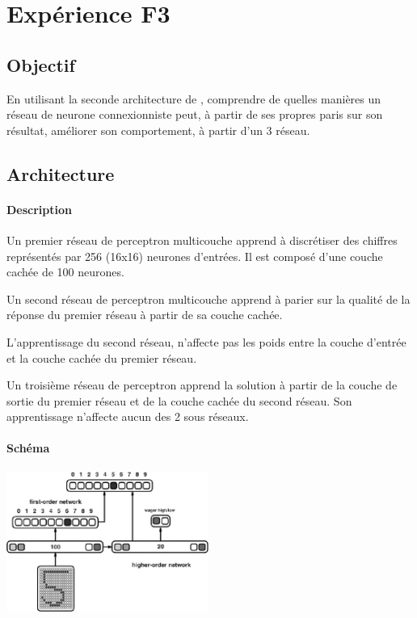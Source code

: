 \section{Expérience F3} 
  \subsection{Objectif}
    En utilisant la seconde architecture de \cite{Cleeremans_2007}, 
    comprendre de quelles manières un réseau de neurone connexionniste peut, à partir de ses propres paris
    sur son résultat, améliorer son comportement, à partir d'un 3 réseau.
  
  
     
  \subsection{Architecture}
    \paragraph{Description}
      Un premier réseau de perceptron multicouche apprend à discrétiser des chiffres représentés
      par 256 (16x16) neurones d'entrées. Il est composé d'une couche cachée de 100 neurones.
      
      Un second réseau de perceptron multicouche apprend à parier sur la qualité de la réponse
      du premier réseau à partir de sa couche cachée.
      
      L'apprentissage du second réseau, n'affecte pas les poids entre la couche d'entrée et la 
      couche cachée du premier réseau.
      
      
      Un troisième réseau de perceptron apprend la solution à partir de la couche de sortie du
      premier réseau et de la couche cachée du second
      réseau. Son apprentissage n'affecte aucun des 2 sous réseaux.


    \paragraph{Schéma}
      \begin{center}
	\includegraphics[width=250px]{data/expF3/schema.png}
      \end{center}
      
